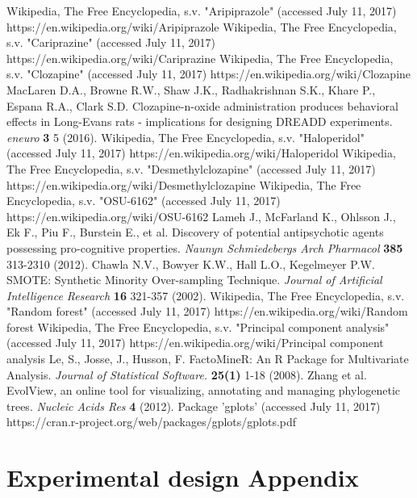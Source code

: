\documentclass[a4paper,12pt]{article}
\begin{document}
\begin{thebibliography}{99}
Wikipedia, The Free Encyclopedia, s.v.  "Aripiprazole" (accessed July 11, 2017) https://en.wikipedia.org/wiki/Aripiprazole
Wikipedia, The Free Encyclopedia, s.v.  "Cariprazine" (accessed July 11, 2017) https://en.wikipedia.org/wiki/Cariprazine
Wikipedia, The Free Encyclopedia, s.v.  "Clozapine" (accessed July 11, 2017) https://en.wikipedia.org/wiki/Clozapine
MacLaren D.A., Browne R.W., Shaw J.K., Radhakrishnan S.K., Khare P., Espana R.A., Clark S.D. Clozapine-n-oxide administration produces behavioral effects in Long-Evans rats - implications for designing DREADD experiments. \textit{eneuro} \textbf{3} 5 (2016).
Wikipedia, The Free Encyclopedia, s.v.  "Haloperidol" (accessed July 11, 2017) https://en.wikipedia.org/wiki/Haloperidol
Wikipedia, The Free Encyclopedia, s.v.  "Desmethylclozapine" (accessed July 11, 2017) https://en.wikipedia.org/wiki/Desmethylclozapine
Wikipedia, The Free Encyclopedia, s.v.  "OSU-6162" (accessed July 11, 2017) https://en.wikipedia.org/wiki/OSU-6162
Lameh J., McFarland K., Ohlsson J., Ek F., Piu F., Burstein E., et al. Discovery of potential antipsychotic agents possessing pro-cognitive properties. \textit{Naunyn Schmiedebergs Arch Pharmacol} \textbf{385} 313-2310 (2012).
Chawla N.V., Bowyer K.W., Hall L.O., Kegelmeyer P.W. SMOTE: Synthetic Minority Over-sampling Technique. \textit{Journal of Artificial Intelligence Research} \textbf{16} 321-357 (2002).
Wikipedia, The Free Encyclopedia, s.v.  "Random forest" (accessed July 11, 2017) https://en.wikipedia.org/wiki/Random forest
Wikipedia, The Free Encyclopedia, s.v.  "Principal component analysis" (accessed July 11, 2017) https://en.wikipedia.org/wiki/Principal component analysis
Le, S., Josse, J., Husson, F. FactoMineR: An R Package for Multivariate Analysis. \textit{Journal of Statistical Software.} \textbf{25(1)} 1-18 (2008).
Zhang et al. EvolView, an online tool for visualizing, annotating and managing phylogenetic trees. \textit{Nucleic Acids Res} \textbf{4} (2012).
Package 'gplots' (accessed July 11, 2017) https://cran.r-project.org/web/packages/gplots/gplots.pdf
\end{thebibliography}


\appendix
\newpage
\section{Experimental design Appendix}
\end{document}
